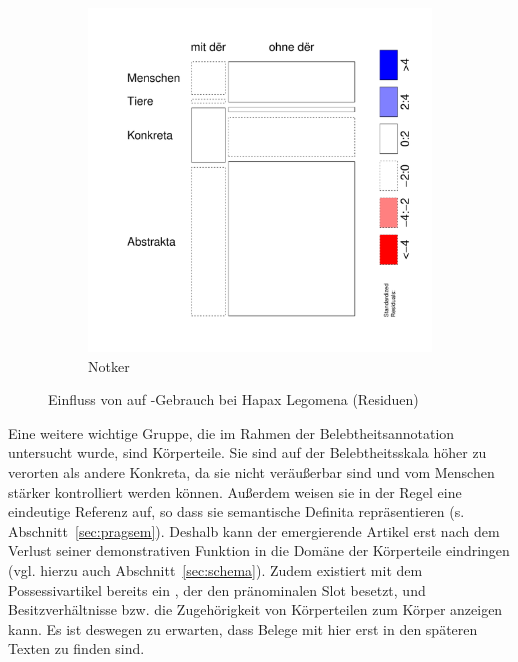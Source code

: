 \begin{figure}
\begin{subfigure}[b]{.5\linewidth}
  \includegraphics[height=.25\textheight]{generated/images/bel-hapaxe-residuals-N}
\caption {Notker}
\end{subfigure}
\caption{Einfluss von  auf -Gebrauch bei Hapax Legomena (Residuen)}
\label{fig:bel-hapaxe-residuals}
\end{figure}

Eine weitere wichtige Gruppe, die im Rahmen der Belebtheitsannotation untersucht wurde, sind Körperteile. Sie sind auf der Belebtheitsskala  höher zu verorten als andere  Konkreta, da sie nicht veräußerbar sind und vom Menschen stärker kontrolliert werden können. Außerdem weisen sie in der Regel eine eindeutige Referenz  auf, so dass sie semantische Definita  repräsentieren (s.  Abschnitt~\ref{sec:pragsem}). Deshalb kann der emergierende Artikel erst nach dem Verlust seiner demonstrativen Funktion in die Domäne der Körperteile eindringen (vgl. hierzu auch Abschnitt~\ref{sec:schema}). Zudem existiert mit dem Possessivartikel  bereits ein , der den pränominalen Slot besetzt, und Besitzverhältnisse bzw. die Zugehörigkeit von Körperteilen zum Körper anzeigen kann. Es ist deswegen zu erwarten, dass Belege mit  hier erst in den späteren Texten zu finden sind.\largerpage[-2]

